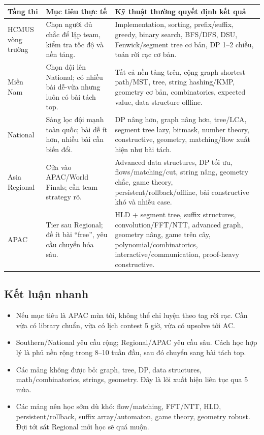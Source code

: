 \documentclass[11pt,a4paper]{article}
\begin{document}
\begin{longtable}{p{2.8cm}p{4.1cm}p{7.3cm}}
\toprule
\textbf{Tầng thi} & \textbf{Mục tiêu thực tế} & \textbf{Kỹ thuật thường quyết định kết quả}\\
\midrule
HCMUS vòng trường & Chọn người đủ chắc để lập team, kiểm tra tốc độ và nền tảng. & Implementation, sorting, prefix/suffix, greedy, binary search, BFS/DFS, DSU, Fenwick/segment tree cơ bản, DP 1--2 chiều, toán rời rạc cơ bản.\\
\addlinespace
Miền Nam & Chọn đội lên National; có nhiều bài dễ-vừa nhưng luôn có bài tách top. & Tất cả nền tảng trên, cộng graph shortest path/MST, tree, string hashing/KMP, geometry cơ bản, combinatorics, expected value, data structure offline.\\
\addlinespace
National & Sàng lọc đội mạnh toàn quốc; bài dễ ít hơn, nhiều bài cần biến đổi. & DP nâng hơn, graph nâng hơn, tree/LCA, segment tree lazy, bitmask, number theory, constructive, geometry, matching/flow xuất hiện như bài tách.\\
\addlinespace
Asia Regional & Cửa vào APAC/World Finals; cần team strategy rõ. & Advanced data structures, DP tối ưu, flows/matching/cut, string nâng, geometry chắc, game theory, persistent/rollback/offline, bài constructive khó và nhiều case.\\
\addlinespace
APAC & Tier sau Regional; đề ít bài ``free'', yêu cầu chuyển hóa sâu. & HLD + segment tree, suffix structures, convolution/FFT/NTT, advanced graph, geometry nâng, game trên cây, polynomial/combinatorics, interactive/communication, proof-heavy constructive.\\
\bottomrule
\end{longtable}

\subsection{Kết luận nhanh}

\begin{itemize}
  \item Nếu mục tiêu là APAC mùa tới, không thể chỉ luyện theo tag rời rạc. Cần vừa có library chuẩn, vừa có lịch contest 5 giờ, vừa có upsolve tới AC.
  \item Southern/National yêu cầu rộng; Regional/APAC yêu cầu sâu. Cách học hợp lý là phủ nền rộng trong 8--10 tuần đầu, sau đó chuyển sang bài tách top.
  \item Các mảng không được bỏ: graph, tree, DP, data structures, math/combinatorics, strings, geometry. Đây là lõi xuất hiện liên tục qua 5 mùa.
  \item Các mảng nên học sớm dù khó: flow/matching, FFT/NTT, HLD, persistent/rollback, suffix array/automaton, game theory, geometry robust. Đợi tới sát Regional mới học sẽ quá muộn.
\end{itemize}
\end{document}
